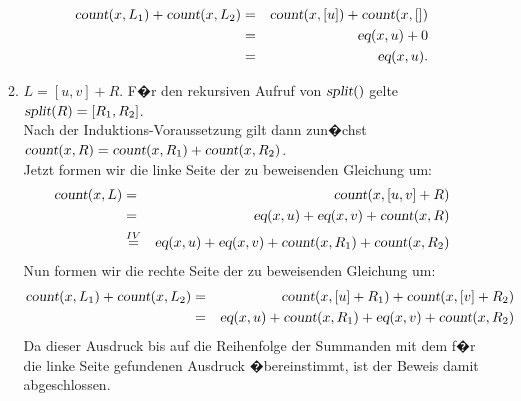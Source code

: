 \documentclass{article}
\begin{document}
\begin{enumerate}
\begin{enumerate}
\begin{eqnarray*}
                  \textsl{count}(x,L_1) + \textsl{count}(x,L_2) 
            & = & \textsl{count}(x,[u]) + \textsl{count}(x,[]) \\
            & = & \textsl{eq}(x,u) + 0 \\
            & = & \textsl{eq}(x,u).
            \end{eqnarray*}
      \item $L = [u,v] + R$.  F�r den rekursiven Aufruf von $\textsl{split}()$ gelte
            \\[0.2cm]
            \hspace*{1.3cm}
            $\textsl{split}(R) = [R_1, R_2]$.
            \\[0.2cm]
            Nach der Induktions-Voraussetzung gilt dann zun�chst
            \\[0.2cm]
            \hspace*{1.3cm}
            $\textsl{count}(x,R) = \textsl{count}(x, R_1) + \textsl{count}(x, R_2)$.
            \\[0.2cm]
            Jetzt formen wir die linke Seite der zu beweisenden Gleichung um:
            \begin{eqnarray*}
                    \textsl{count}(x,L)
              & = & \textsl{count}(x,[u,v] + R) \\
              & = & \textsl{eq}(x,u) + \textsl{eq}(x,v) + \textsl{count}(x,R) \\
              & \stackrel{IV}{=} & \textsl{eq}(x,u) + \textsl{eq}(x,v) + 
                \textsl{count}(x,R_1) + \textsl{count}(x,R_2) 
            \end{eqnarray*}
            Nun formen wir die rechte Seite der zu beweisenden Gleichung um:
            \begin{eqnarray*}
                    \textsl{count}(x,L_1) + \textsl{count}(x,L_2)
              & = & \textsl{count}(x,[u] + R_1) + \textsl{count}(x, [v] + R_2) \\
              & = & \textsl{eq}(x,u) + \textsl{count}(x,R_1) + \textsl{eq}(x,v) + \textsl{count}(x, R_2) 
            \end{eqnarray*}
            Da dieser Ausdruck bis auf die Reihenfolge der Summanden mit dem f�r die linke Seite
            gefundenen Ausdruck �bereinstimmt, ist der Beweis damit abgeschlossen.
      \end{enumerate}
\end{enumerate}
\vspace{0.3cm}
\end{document}
